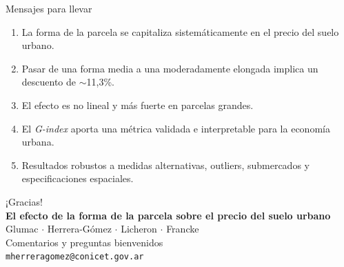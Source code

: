 \documentclass[11pt,aspectratio=169]{beamer}
\newcommand{\Gindex}{\textit{G-index}\xspace}
\begin{document}
\begin{frame}{Mensajes para llevar}
  \begin{enumerate}
    \item La \alert{forma de la parcela se capitaliza sistemáticamente} en el precio del suelo urbano.
    \item Pasar de una forma media a una moderadamente elongada implica un \alert{descuento de $\sim$11,3\%}.
    \item El efecto es \alert{no lineal} y \alert{más fuerte en parcelas grandes}.
    \item El \Gindex aporta una métrica \alert{validada e interpretable} para la economía urbana.
    \item Resultados \alert{robustos} a medidas alternativas, outliers, submercados y especificaciones espaciales.
  \end{enumerate}
\end{frame}

\begin{frame}[plain]
  \centering
  \vspace{1.5cm}
  {\Huge \textcolor{azulprincipal}{¡Gracias!}}\\[1cm]
  {\large \textbf{El efecto de la forma de la parcela sobre el precio del suelo urbano}}\\[0.5cm]
  {\normalsize Glumac \quad $\cdot$ \quad Herrera-Gómez \quad $\cdot$ \quad Licheron \quad $\cdot$ \quad Francke}\\[1cm]
  {\small Comentarios y preguntas bienvenidos}\\[0.3em]
  {\footnotesize \texttt{mherreragomez@conicet.gov.ar}}
\end{frame}
\end{document}
